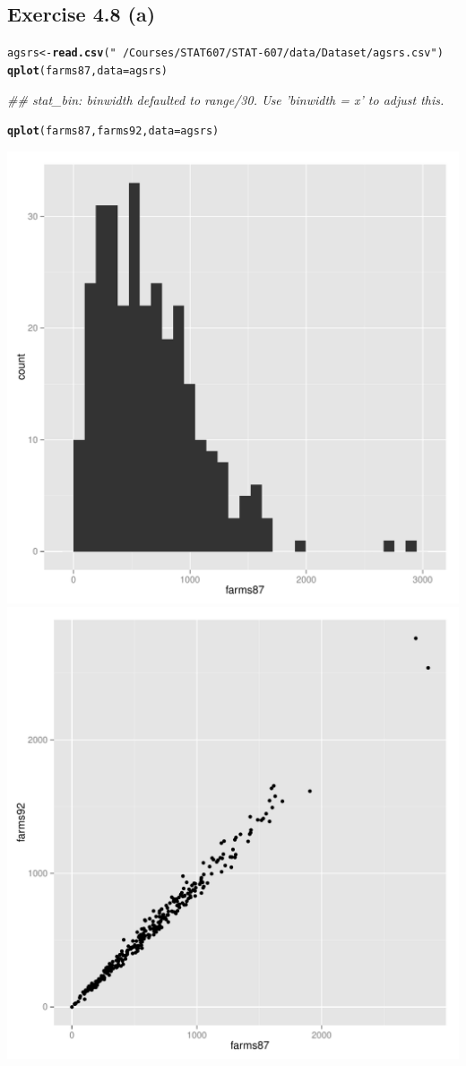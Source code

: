 \documentclass{article}\usepackage{graphicx, color}
\makeatletter
\newcommand{\hlfunctioncall}[1]{\textcolor[rgb]{0.501960784313725,0,0.329411764705882}{\textbf{#1}}}%
\newcommand{\hlstring}[1]{\textcolor[rgb]{0.6,0.6,1}{#1}}%
\newenvironment{kframe}{%
 \def\at@end@of@kframe{}%
 \ifinner\ifhmode%
  \def\at@end@of@kframe{\end{minipage}}%
  \begin{minipage}{\columnwidth}%
 \fi\fi%
 \def\FrameCommand##1{\hskip\@totalleftmargin \hskip-\fboxsep
 \colorbox{shadecolor}{##1}\hskip-\fboxsep
     \hskip-\linewidth \hskip-\@totalleftmargin \hskip\columnwidth}%
 \MakeFramed {\advance\hsize-\width
   \@totalleftmargin\z@ \linewidth\hsize
   \@setminipage}}%
 {\par\unskip\endMakeFramed%
 \at@end@of@kframe}
\newenvironment{knitrout}{}{} %
\makeatother
\begin{document}
\subsection*{Exercise 4.8 (a)}
\begin{knitrout}
\color{fgcolor}\begin{kframe}
\begin{alltt}
agsrs <- \hlfunctioncall{read.csv}(\hlstring{"~/Courses/STAT 607/STAT-607/data/Dataset/agsrs.csv"})
\hlfunctioncall{qplot}(farms87, data = agsrs)
\end{alltt}


{\ttfamily\noindent\itshape\textcolor{messagecolor}{\#\# stat\_bin: binwidth defaulted to range/30. Use 'binwidth = x' to adjust this.}}\begin{alltt}
\hlfunctioncall{qplot}(farms87, farms92, data = agsrs)
\end{alltt}
\end{kframe}

{\centering \includegraphics[width=.45\textwidth]{figure/unnamed-chunk-51} \includegraphics[width=.45\textwidth]{figure/unnamed-chunk-52} 

}


\end{knitrout}
\end{document}
